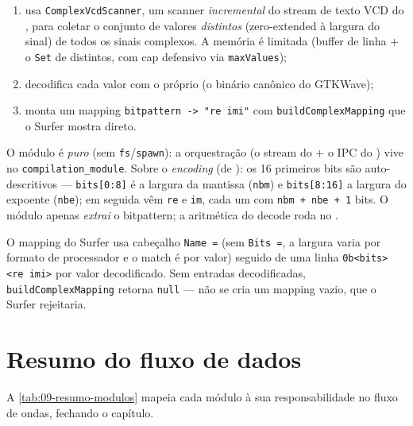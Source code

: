 \begin{enumerate}[leftmargin=*]
  \item usa \lstinline|ComplexVcdScanner|, um scanner \emph{incremental} do stream
    de texto VCD do , para coletar o conjunto de valores
    \emph{distintos} (zero-extended à largura do sinal) de todos os sinais
    complexos. A memória é limitada (buffer de linha $+$ o \lstinline|Set| de
    distintos, com cap defensivo via \lstinline|maxValues|);
  \item decodifica cada valor com o próprio  (o binário
    canônico do GTKWave);
  \item monta um mapping \lstinline|bitpattern -> "re imi"| com
    \lstinline|buildComplexMapping| que o Surfer mostra direto.
\end{enumerate}

O módulo é \emph{puro} (sem \lstinline|fs|/\lstinline|spawn|): a orquestração (o
stream do  $+$ o IPC do ) vive no
\lstinline|compilation_module|. Sobre o \emph{encoding} (de ):
os 16 primeiros bits são auto-descritivos --- \lstinline|bits[0:8]| é a largura
da mantissa (\lstinline|nbm|) e \lstinline|bits[8:16]| a largura do expoente
(\lstinline|nbe|); em seguida vêm \lstinline|re| e \lstinline|im|, cada um com
\lstinline|nbm + nbe + 1| bits. O módulo apenas \emph{extrai} o bitpattern; a
aritmética do decode roda no .

\begin{nota}
O mapping do Surfer usa cabeçalho \lstinline|Name =| (sem \lstinline|Bits =|, a
largura varia por formato de processador e o match é por valor) seguido de uma
linha \lstinline|0b<bits> <re imi>| por valor decodificado. Sem entradas
decodificadas, \lstinline|buildComplexMapping| retorna \lstinline|null| --- não
se cria um mapping vazio, que o Surfer rejeitaria.
\end{nota}

\section{Resumo do fluxo de dados}

A \autoref{tab:09-resumo-modulos} mapeia cada módulo à sua responsabilidade no
fluxo de ondas, fechando o capítulo.

